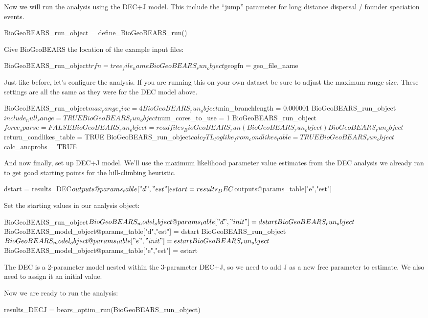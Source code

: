 \documentclass[11pt]{article}
\begin{document}
Now we will run the analysis using the DEC+J model.
This include the ``jump'' parameter for long distance dispersal / founder
speciation events.
\begin{code}
BioGeoBEARS_run_object = define_BioGeoBEARS_run()
\end{code}
Give BioGeoBEARS the location of the example input files:
\begin{code}
BioGeoBEARS_run_object$trfn = tree_file_name
BioGeoBEARS_run_object$geogfn = geo_file_name
\end{code}
Just like before, let's configure the analysis.
If you are running this on your own dataset be sure
to adjust the maximum range size. These settings are
all the same as they were for the DEC model above.
\begin{code}
BioGeoBEARS_run_object$max_range_size = 4
BioGeoBEARS_run_object$min_branchlength = 0.000001 
BioGeoBEARS_run_object$include_null_range = TRUE
BioGeoBEARS_run_object$num_cores_to_use = 1
BioGeoBEARS_run_object$force_sparse = FALSE 
BioGeoBEARS_run_object = readfiles_BioGeoBEARS_run(BioGeoBEARS_run_object)
BioGeoBEARS_run_object$return_condlikes_table = TRUE
BioGeoBEARS_run_object$calc_TTL_loglike_from_condlikes_table = TRUE
BioGeoBEARS_run_object$calc_ancprobs = TRUE 
\end{code}
And now finally, set up DEC+J model.
We'll use the maximum likelihood parameter value estimates from the 
DEC analysis we already ran to get good starting points for the 
hill-climbing heuristic.
\begin{code}
dstart = results_DEC$outputs@params_table["d","est"]
estart = results_DEC$outputs@params_table["e","est"]
\end{code}
Set the starting values in our analysis object:
\begin{code}
BioGeoBEARS_run_object$BioGeoBEARS_model_object@params_table["d","init"] = dstart
BioGeoBEARS_run_object$BioGeoBEARS_model_object@params_table["d","est"] = dstart
BioGeoBEARS_run_object$BioGeoBEARS_model_object@params_table["e","init"] = estart
BioGeoBEARS_run_object$BioGeoBEARS_model_object@params_table["e","est"] = estart
\end{code}
The DEC is a 2-parameter model nested within the 3-parameter DEC+J,
so we need to add J as a new free parameter to estimate.
We also need to assign it an initial value.
Now we are ready to run the analysis:
\begin{code}
results_DECJ = bears_optim_run(BioGeoBEARS_run_object)
\end{code}
\end{document}
